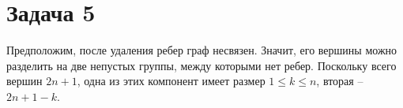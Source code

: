 \documentclass{article}
\begin{document}












	\section*{Задача 5}

	Предположим, после удаления ребер граф несвязен. Значит, его вершины можно разделить на две непустых группы, между которыми нет ребер. Поскольку всего вершин $2n + 1$, одна из этих компонент имеет размер $1 \le k \le n$, вторая -- $2n + 1 - k$. 
\end{document}

